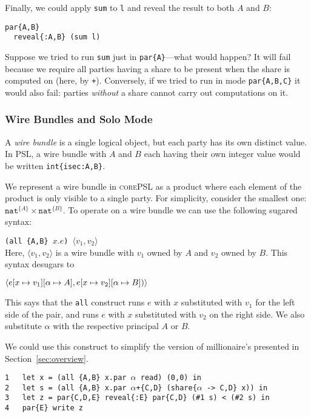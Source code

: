 \documentclass[10pt]{article}
\newcommand{\tnat}{\ensuremath{\mathtt{nat}}}
\newcommand{\tpair}[2]{\ensuremath{{#1} \times {#2}}}
\newcommand{\epair}[2]{\ensuremath{\langle {#1}, {#2} \rangle}}
\newcommand{\lang}{\textsc{corePSL}\xspace}
\begin{document}
Finally, we could apply \verb+sum+ to \verb+l+ and reveal the result
to both $A$ and $B$:
\begin{verbatim}
par{A,B}
  reveal{:A,B} (sum l)
\end{verbatim}

Suppose we tried to run \verb+sum+ just in \verb+par{A}+---what would
happen? It will fail because we require all parties having a share to
be present when the share is computed on (here, by
\verb!+!). Conversely, if we tried to run in mode \verb+par{A,B,C}+ it
would also fail: parties \emph{without} a share cannot carry out
computations on it.

\subsubsection{Wire Bundles and Solo Mode}
\label{sec:wirebundles}

A \emph{wire bundle} is a single logical object, but each party has
its own distinct value. In PSL, a wire bundle with $A$ and $B$ each
having their own integer value would be written \texttt{int\{isec:A,B\}}.

We represent a wire bundle in \lang as a product where each
element of the product is only visible to a single party. For
simplicity, consider the smallest one:
$\tpair{\tnat^{\{A\}}}{\tnat^{\{B\}}}$. To operate on a wire bundle we can use the
following sugared syntax:

\bigskip
\noindent
\verb+(all {A,B} +$x.e$\verb+) +$\epair{v_1}{v_2}$\\

Here, $\epair{v_1}{v_2}$ is a wire bundle with $v_1$ owned by $A$ and $v_2$ owned by
$B$. This syntax desugars to

\bigskip
\noindent
$
\epair{e[x \mapsto v_1][\alpha \mapsto A]}{e[x \mapsto v_2][\alpha \mapsto B])}\\
$

This says that the \texttt{all} construct runs $e$ with $x$
substituted with $v_1$ for the left side of the pair, and runs $e$
with $x$ substituted with $v_2$ on the right side. We also substitute
$\alpha$ with the respective principal $A$ or $B$.

We could use this construct to simplify the version of millionaire's
presented in Section~\ref{sec:overview}.

\bigskip
\noindent
\verb+1   let x = (all {A,B} x.par +$\alpha$\verb+ read) (0,0) in+\\
\verb+2   let s = (all {A,B} x.par +$\alpha$\verb!+{C,D} (share{!$\alpha$\verb+ -> C,D} x)) in+\\
\verb+3   let z = par{C,D,E} reveal{:E} par{C,D} (#1 s) < (#2 s) in+\\
\verb+4   par{E} write z+
\end{document}
